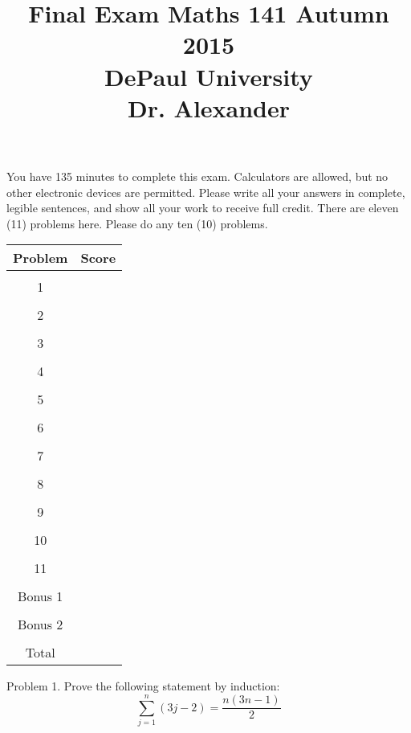 \documentclass[16 pt]{amsart}
\theoremstyle{definition}
\theoremstyle{remark}
\numberwithin{equation}{subsection}
\begin{document}
\title{Final Exam  Maths 141 Autumn 2015 \\ DePaul University\\Dr. Alexander}
\maketitle
You have 135 minutes to complete this exam.  Calculators are allowed, but no other electronic devices are permitted.  Please write all your answers in complete, legible sentences, and show all your work to receive full credit.  There are eleven (11) problems here.  Please do any ten (10) problems.
\vspace{1in}


\begin{center}
  \begin{tabular}{ c | c }
    Problem & Score\\
    \hline
    &\\
    1&\\
    &\\
    2&\\
    &\\
    3&\\
    &\\
    4&\\
    &\\
    5&\\
    &\\
    6&\\
    &\\
    7&\\
    &\\
    8&\\
    &\\
    9&\\
    &\\
    10&\\
    &\\
    11& \\
    &\\
    Bonus 1&\\
    &\\
    Bonus 2&\\
    \hline 
    &\\    
    Total& 
 \end{tabular}
\end{center}

\newpage 
Problem 1. Prove the following statement by induction:
\[
\sum_{j=1}^n (3j-2) = \frac{n(3n-1)}{2}
\]

\vspace{2.5in}
\end{document}

